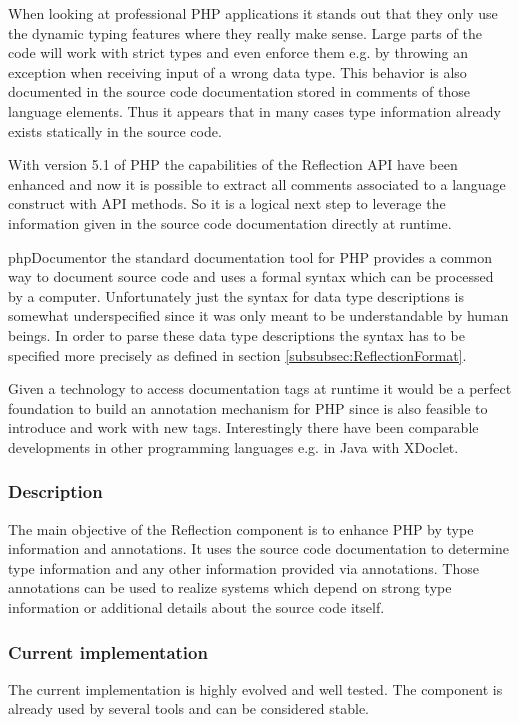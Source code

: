 \documentclass[10pt,final,a4paper,oneside]{article}
\begin{document}
When looking at professional PHP applications
it stands out that they only use the dynamic
typing features where they really make sense.
Large parts of the code will work with strict
types and even enforce them e.g. by throwing
an exception when receiving input of a wrong data type.
This behavior is also documented in the source code
documentation stored in comments of those language elements.
Thus it appears that in many cases type information
already exists statically in the source code.

With version 5.1 of PHP the capabilities of the Reflection API
have been enhanced and now it is possible to extract all comments
associated to a language construct with API methods.
So it is a logical next step to leverage the information
given in the source code documentation directly at runtime.

phpDocumentor \cite{phpDocumentor} the standard documentation tool for PHP
provides a common way to document source code and
uses a formal syntax which can be processed by a computer.
Unfortunately just the syntax for data type descriptions
is somewhat underspecified since it was only meant
to be understandable by human beings.
In order to parse these data type descriptions
the syntax has to be specified more precisely
as defined in section \ref{subsubsec:ReflectionFormat}.

Given a technology to access documentation tags
at runtime it would be a perfect foundation
to build an annotation mechanism for PHP
since is also feasible to introduce and work with new tags.
Interestingly there have been comparable developments in other
programming languages e.g. in Java with XDoclet.


\subsubsection{Description}
The main objective of the Reflection component is
to enhance PHP by type information and annotations.
It uses the source code documentation to determine
type information and any other information provided
via annotations. 
Those annotations can be used to realize systems
which depend on strong type information or
additional details about the source code itself.


\subsubsection{Current implementation}
The current implementation is highly evolved and well tested.
The component is already used by several tools
and can be considered stable.
\end{document}
